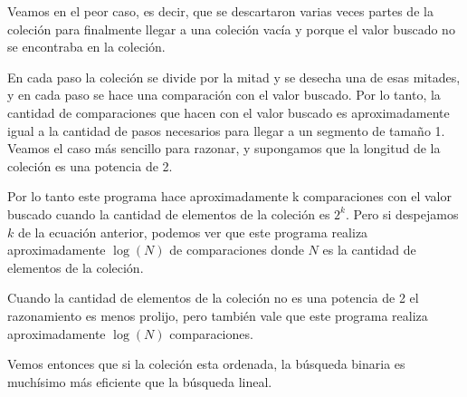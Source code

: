 Veamos en el peor caso, es decir, que se descartaron varias veces partes de la coleción para finalmente llegar a una coleción vacía y porque el valor buscado no se encontraba en la coleción.

En cada paso la coleción se divide por la mitad y se desecha una de esas mitades, y en cada paso se hace una comparación con el valor buscado. Por lo tanto, la cantidad de comparaciones que hacen con el valor buscado es aproximadamente igual a la cantidad de pasos necesarios para llegar a un segmento de tamaño 1. Veamos el caso más sencillo para razonar, y supongamos que la longitud de la coleción es una potencia de 2.

Por lo tanto este programa hace aproximadamente k comparaciones con el valor buscado cuando la cantidad de elementos de la coleción es $2^k$. Pero si despejamos $k$ de la ecuación anterior, podemos ver que este programa realiza aproximadamente $\log(N)$ de comparaciones donde $N$ es la cantidad de elementos de la coleción.

Cuando la cantidad de elementos de la coleción no es una potencia de 2 el razonamiento es menos prolijo, pero también vale que este programa realiza aproximadamente $\log(N)$ comparaciones.

Vemos entonces que si la coleción esta ordenada, la búsqueda binaria es muchísimo más eficiente que la búsqueda lineal.

